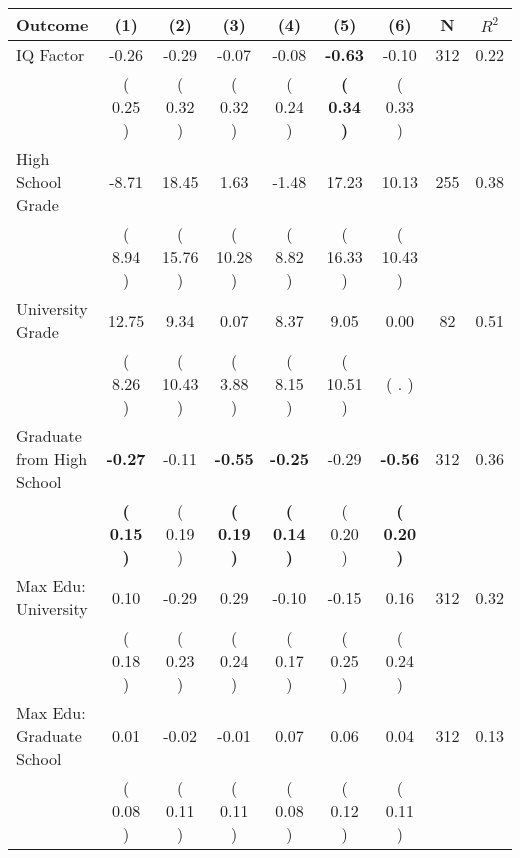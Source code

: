 \begin{tabular}{lcccccccc}
\toprule
 \textbf{Outcome} & \textbf{(1)} & \textbf{(2)} & \textbf{(3)} & \textbf{(4)} & \textbf{(5)} & \textbf{(6)} & \textbf{N} & \textbf{$ R^2$} \\
\midrule
IQ Factor &     -0.26 &     -0.29 &     -0.07 &     -0.08 & \textbf{    -0.63} &     -0.10 & 312 &       0.22 \\ 
 & (     0.25 ) & (     0.32 ) & (     0.32 ) & (     0.24 ) & \textbf{(     0.34 )} & (     0.33 ) & \\
High School Grade &     -8.71 &     18.45 &      1.63 &     -1.48 &     17.23 &     10.13 & 255 &       0.38 \\ 
 & (     8.94 ) & (    15.76 ) & (    10.28 ) & (     8.82 ) & (    16.33 ) & (    10.43 ) & \\
University Grade &     12.75 &      9.34 &      0.07 &      8.37 &      9.05 &      0.00 & 82 &       0.51 \\ 
 & (     8.26 ) & (    10.43 ) & (     3.88 ) & (     8.15 ) & (    10.51 ) & (        . ) & \\
Graduate from High School & \textbf{    -0.27} &     -0.11 & \textbf{    -0.55} & \textbf{    -0.25} &     -0.29 & \textbf{    -0.56} & 312 &       0.36 \\ 
 & \textbf{(     0.15 )} & (     0.19 ) & \textbf{(     0.19 )} & \textbf{(     0.14 )} & (     0.20 ) & \textbf{(     0.20 )} & \\
Max Edu: University &      0.10 &     -0.29 &      0.29 &     -0.10 &     -0.15 &      0.16 & 312 &       0.32 \\ 
 & (     0.18 ) & (     0.23 ) & (     0.24 ) & (     0.17 ) & (     0.25 ) & (     0.24 ) & \\
Max Edu: Graduate School &      0.01 &     -0.02 &     -0.01 &      0.07 &      0.06 &      0.04 & 312 &       0.13 \\ 
 & (     0.08 ) & (     0.11 ) & (     0.11 ) & (     0.08 ) & (     0.12 ) & (     0.11 ) & \\
\bottomrule
\end{tabular}
